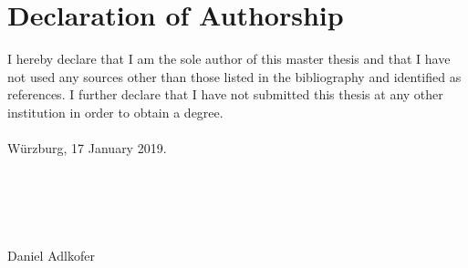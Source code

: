\chapter*{Declaration of Authorship}
I hereby declare that I am the sole author of this master thesis and that I have not used any sources other than those listed in the bibliography and identified as references.\newline
I further declare that I have not submitted this thesis at any other institution in order to obtain a degree.
\\\\
W\"{u}rzburg, 17 January 2019.
\\\\\\\\\\
\underline{\hspace{8cm}}\\
Daniel Adlkofer

